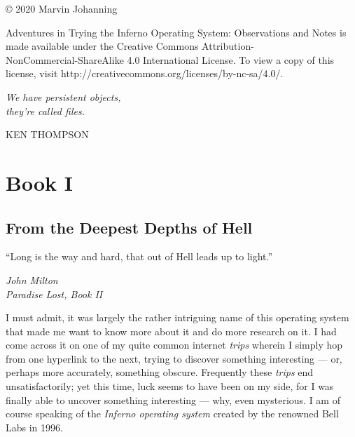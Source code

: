 \documentclass[a4paper,12pt]{report}
\newlength\longest
\begin{document}
\noindent
© 2020 Marvin Johanning

Adventures in Trying the Inferno Operating System: Observations and Notes is made available under the Creative Commons Attribution-\\NonCommercial-ShareAlike 4.0 International License. To view a copy of this license, visit http://creativecommons.org/licenses/by-nc-sa/4.0/.


\clearpage
\thispagestyle{empty}
\null\vfill
\settowidth{}
\begin{center}
\parbox{\longest}{%
  \raggedright{\huge\itshape%
    We have persistent objects, \\they're called files. \par\bigskip
  }
  \raggedleft\Large\MakeUppercase{Ken Thompson}\par%
}
\vfill\vfill
\clearpage\newpage
\end{center}


\thispagestyle{empty}
  \mbox{}
  \newpage


\part*{Book I}
  \newpage

\thispagestyle{empty}
  \mbox{}
  \newpage

\chapter*{From the Deepest Depths of Hell}

\epigraph{``Long is the way and hard, that out of Hell leads up to light.''}{\textit{John Milton\\Paradise Lost, Book II}}

I must admit, it was largely the rather intriguing name of this operating system that made me want to know more about it and do more research on it. I had come across it on one of my quite common internet \textit{trips} wherein I simply hop from one hyperlink to the next, trying to discover something interesting — or, perhaps more accurately, something obscure. 
Frequently these \textit{trips} end unsatisfactorily; yet this time, luck seems to have been on my side, for I was finally able to uncover something interesting — why, even mysterious. I am of course speaking of the \textit{Inferno operating system} created by the renowned Bell Labs in 1996. 
\end{document}
